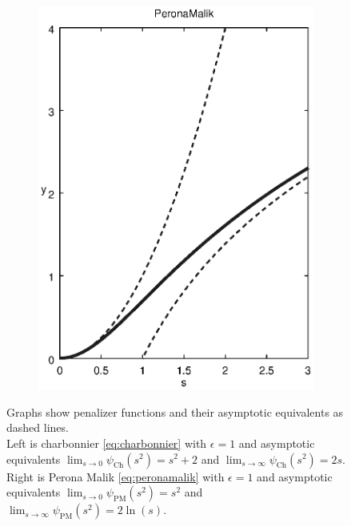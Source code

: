 \documentclass[journal]{vgtc}
\newcommand{\charbonnier}{\psi_{\text{Ch}}}
\newcommand{\peronamalik}{\psi_{\text{PM}}}
\begin{document}
\begin{figure}[htb]
\begin{subfigure}{0.49\linewidth}
\includegraphics[width=\linewidth]{images/peronamalik.eps}
\end{subfigure}
\caption{
Graphs show penalizer functions and their asymptotic equivalents as dashed lines.\\
Left is charbonnier \cref{eq:charbonnier} with $\epsilon=1$ and asymptotic equivalents $\lim_{s\to 0}\charbonnier(s^2)=s^2+2$ and $\lim_{s\to\infty}\charbonnier(s^2)=2s$.\\
Right is Perona Malik \cref{eq:peronamalik} with $\epsilon=1$ and asymptotic equivalents $\lim_{s\to 0}\peronamalik(s^2)=s^2$ and $\lim_{s\to\infty}\peronamalik(s^2)=2\ln(s)$.
}
\label{fig:penalizers}
\end{figure}
\end{document}
